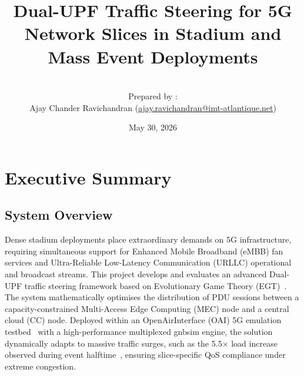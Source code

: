 \documentclass[11pt,a4paper,english]{article}
\begin{document}
\entity{\textbf{\large{}}}

\title{Dual-UPF Traffic Steering for 5G Network Slices in Stadium and Mass Event Deployments}

\author{
    \\
   Prepared by :\\
	Ajay Chander Ravichandran (\href{mailto:ajay.ravichandran@imt-atlantique.net}{ajay.ravichandran@imt-atlantique.net})
}


\date{May 30, 2026}
\IMTAfrontcover
\pagestyle{IMTAfancy}

\IMTAsommaire
\newpage


\section{Executive Summary}
\subsection{System Overview}
Dense stadium deployments place extraordinary demands on 5G infrastructure, requiring simultaneous support for Enhanced Mobile Broadband (eMBB) fan services and Ultra-Reliable Low-Latency Communication (URLLC) operational and broadcast streams. This project develops and evaluates an advanced Dual-UPF traffic steering framework based on Evolutionary Game Theory (EGT)~\cite{Alevizaki2021upf}. The system mathematically optimises the distribution of PDU sessions between a capacity-constrained Multi-Access Edge Computing (MEC) node and a central cloud (CC) node. Deployed within an OpenAirInterface (OAI) 5G emulation testbed~\cite{oai_cn5g} with a high-performance multiplexed gnbsim engine, the solution dynamically adapts to massive traffic surges, such as the 5.5$\times$ load increase observed during event halftime~\cite{superbowl_lvii}, ensuring slice-specific QoS compliance under extreme congestion.
\end{document}
